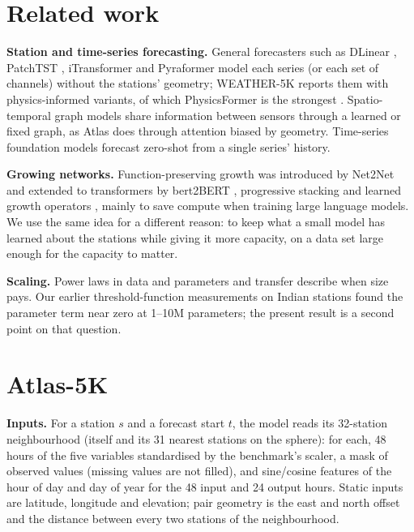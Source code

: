 \documentclass{article}
\begin{document}
\section{Related work}

\textbf{Station and time-series forecasting.} General forecasters such as DLinear \citep{zeng2023dlinear}, PatchTST
\citep{nie2023patchtst}, iTransformer \citep{liu2024itransformer} and Pyraformer \citep{liu2022pyraformer} model each
series (or each set of channels) without the stations' geometry; WEATHER-5K reports them with physics-informed variants,
of which PhysicsFormer is the strongest \citep{han2026weather5k}. Spatio-temporal graph models
\citep{li2018dcrnn,wu2019graphwavenet,shao2022stid} share information between sensors through a learned or fixed graph,
as Atlas does through attention biased by geometry. Time-series foundation models
\citep{das2024timesfm,ansari2024chronos,ansari2025chronos2} forecast zero-shot from a single series' history.

\textbf{Growing networks.} Function-preserving growth was introduced by Net2Net \citep{chen2016net2net} and extended to
transformers by bert2BERT \citep{chen2022bert2bert}, progressive stacking \citep{gong2019stacking} and learned growth
operators \citep{wang2023ligo}, mainly to save compute when training large language models. We use the same idea for a
different reason: to keep what a small model has learned about the stations while giving it more capacity, on a data
set large enough for the capacity to matter.

\textbf{Scaling.} Power laws in data and parameters \citep{kaplan2020scaling,hoffmann2022chinchilla} and transfer
\citep{hernandez2021scaling} describe when size pays. Our earlier threshold-function measurements on Indian stations
found the parameter term near zero at 1--10M parameters; the present result is a second point on that question.

\section{Atlas-5K}
\label{sec:model}

\textbf{Inputs.} For a station $s$ and a forecast start $t$, the model reads its 32-station neighbourhood (itself and
its 31 nearest stations on the sphere): for each, 48 hours of the five variables standardised by the benchmark's
scaler, a mask of observed values (missing values are not filled), and sine/cosine features of the hour of day and
day of year for the 48 input and 24 output hours. Static inputs are latitude, longitude and elevation; pair geometry is
the east and north offset and the distance between every two stations of the neighbourhood.
\end{document}
